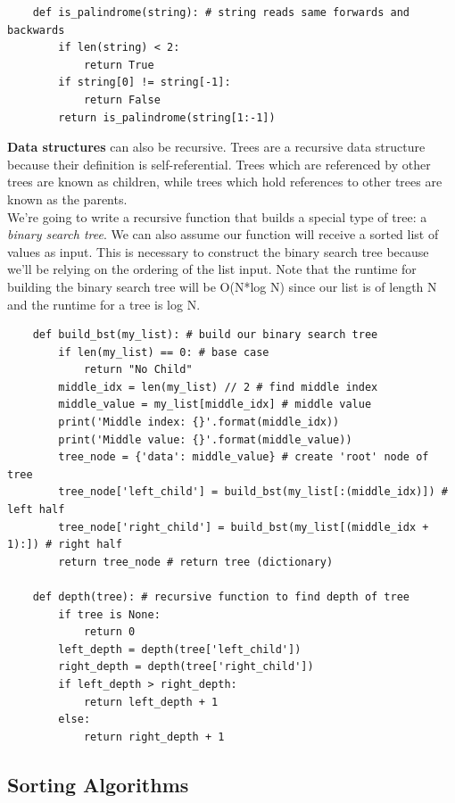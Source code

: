 \documentclass[11pt, a4paper]{article}
\begin{document}
\begin{spacing}{1.1}
\begin{lstlisting}
	def is_palindrome(string): # string reads same forwards and backwards
		if len(string) < 2:
			return True
		if string[0] != string[-1]:
			return False
		return is_palindrome(string[1:-1]) \end{lstlisting} \vspace*{2mm}
	\textbf{Data structures} can also be recursive. Trees are a recursive data structure because their definition is self-referential. Trees which are referenced by other trees are known as children, while trees which hold references to other trees are known as the parents. \vspace*{1mm} \\
	We’re going to write a recursive function that builds a special type of tree: a \textit{binary search tree}. We can also assume our function will receive a sorted list of values as input. This is necessary to construct the binary search tree because we’ll be relying on the ordering of the list input. Note that the runtime for building the binary search tree will be O(N*log N) since our list is of length N and the runtime for a tree is log N.
	\begin{lstlisting}
	def build_bst(my_list): # build our binary search tree
		if len(my_list) == 0: # base case
			return "No Child"
		middle_idx = len(my_list) // 2 # find middle index
		middle_value = my_list[middle_idx] # middle value
		print('Middle index: {}'.format(middle_idx))
		print('Middle value: {}'.format(middle_value))
		tree_node = {'data': middle_value} # create 'root' node of tree
		tree_node['left_child'] = build_bst(my_list[:(middle_idx)]) # left half
		tree_node['right_child'] = build_bst(my_list[(middle_idx + 1):]) # right half
		return tree_node # return tree (dictionary)	
		
	def depth(tree): # recursive function to find depth of tree
		if tree is None:
			return 0 
		left_depth = depth(tree['left_child'])
		right_depth = depth(tree['right_child'])
		if left_depth > right_depth:
			return left_depth + 1
		else:
			return right_depth + 1 \end{lstlisting} \newpage
	\subsection{Sorting Algorithms}

\end{spacing}
\end{document}
